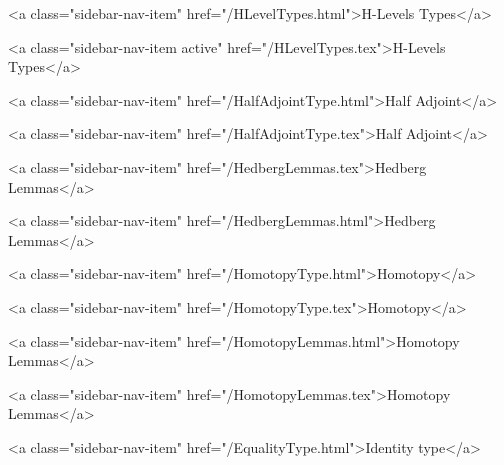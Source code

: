       
        
          <a class="sidebar-nav-item" href="/HLevelTypes.html">H-Levels Types</a>
        
      
    
      
        
          <a class="sidebar-nav-item active" href="/HLevelTypes.tex">H-Levels Types</a>
        
      
    
      
        
          <a class="sidebar-nav-item" href="/HalfAdjointType.html">Half Adjoint</a>
        
      
    
      
        
          <a class="sidebar-nav-item" href="/HalfAdjointType.tex">Half Adjoint</a>
        
      
    
      
        
          <a class="sidebar-nav-item" href="/HedbergLemmas.tex">Hedberg Lemmas</a>
        
      
    
      
        
          <a class="sidebar-nav-item" href="/HedbergLemmas.html">Hedberg Lemmas</a>
        
      
    
      
        
          <a class="sidebar-nav-item" href="/HomotopyType.html">Homotopy</a>
        
      
    
      
        
          <a class="sidebar-nav-item" href="/HomotopyType.tex">Homotopy</a>
        
      
    
      
        
          <a class="sidebar-nav-item" href="/HomotopyLemmas.html">Homotopy Lemmas</a>
        
      
    
      
        
          <a class="sidebar-nav-item" href="/HomotopyLemmas.tex">Homotopy Lemmas</a>
        
      
    
      
        
          <a class="sidebar-nav-item" href="/EqualityType.html">Identity type</a>
        
      
    
